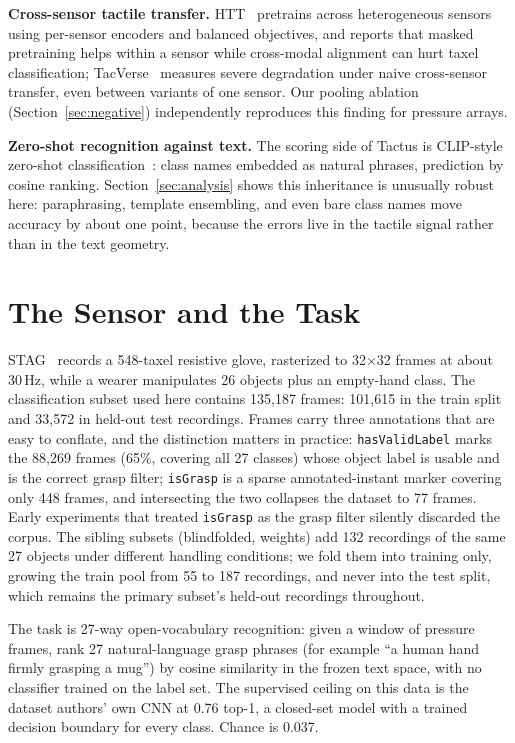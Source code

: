 \documentclass[conference]{IEEEtran}
\begin{document}
\textbf{Cross-sensor tactile transfer.} HTT~\cite{bi2026htt} pretrains across
heterogeneous sensors using per-sensor encoders and balanced objectives, and reports that
masked pretraining helps within a sensor while cross-modal alignment can hurt taxel
classification; TacVerse~\cite{wei2026tacverse} measures severe degradation under naive
cross-sensor transfer, even between variants of one sensor. Our pooling ablation
(Section~\ref{sec:negative}) independently reproduces this finding for pressure arrays.

\textbf{Zero-shot recognition against text.} The scoring side of Tactus is CLIP-style
zero-shot classification~\cite{radford2021clip}: class names embedded as natural phrases,
prediction by cosine ranking. Section~\ref{sec:analysis} shows this inheritance is
unusually robust here: paraphrasing, template ensembling, and even bare class names move
accuracy by about one point, because the errors live in the tactile signal rather than in
the text geometry.

\section{The Sensor and the Task}
\label{sec:task}
STAG~\cite{sundaram2019stag} records a 548-taxel resistive glove, rasterized to
32$\times$32 frames at about 30\,Hz, while a wearer manipulates 26 objects plus an
empty-hand class. The classification subset used here contains 135{,}187 frames: 101{,}615
in the train split and 33{,}572 in held-out test recordings. Frames carry three
annotations that are easy to conflate, and the distinction matters in practice:
\texttt{hasValidLabel} marks the 88{,}269 frames (65\%, covering all 27 classes) whose
object label is usable and is the correct grasp filter; \texttt{isGrasp} is a sparse
annotated-instant marker covering only 448 frames, and intersecting the two collapses the
dataset to 77 frames. Early experiments that treated \texttt{isGrasp} as the grasp filter
silently discarded the corpus. The sibling subsets (blindfolded, weights) add 132
recordings of the same 27 objects under different handling conditions; we fold them into
training only, growing the train pool from 55 to 187 recordings, and never into the test
split, which remains the primary subset's held-out recordings throughout.

The task is 27-way open-vocabulary recognition: given a window of pressure frames, rank 27
natural-language grasp phrases (for example ``a human hand firmly grasping a mug'') by
cosine similarity in the frozen text space, with no classifier trained on the label set.
The supervised ceiling on this data is the dataset authors' own CNN at 0.76 top-1, a
closed-set model with a trained decision boundary for every class. Chance is 0.037.
\end{document}
